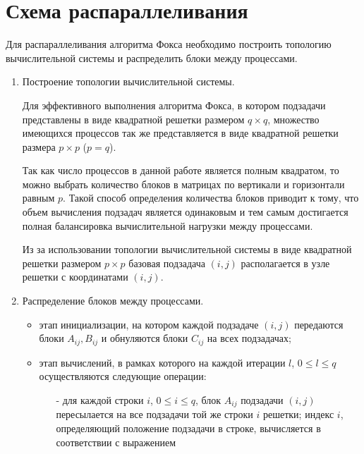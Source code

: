 \documentclass{report}
\begin{document}
\section*{Схема распараллеливания}
Для распараллеливания алгоритма Фокса необходимо построить топологию вычислительной системы и распределить блоки между процессами.

\begin{enumerate}
    \item Построение топологии вычислительной системы.
        \par Для эффективного выполнения алгоритма Фокса, в котором подзадачи представлены в виде квадратной решетки размером {\itshape $q \times q$}, множество имеющихся процессов так же представляется в виде квадратной решетки размера {\itshape $p \times p$} ({\itshape $p = q$}).
        \par Так как число процессов в данной работе является полным квадратом, то можно выбрать количество блоков в матрицах по вертикали и горизонтали равным {\itshape $p$}. Такой способ определения количества блоков приводит к тому, что объем вычисления подзадач является одинаковым и тем самым достигается полная балансировка вычислительной нагрузки между процессами.
        \par Из за использовании топологии вычислительной системы в виде квадратной решетки размером {\itshape $p \times p$} базовая подзадача {\itshape $(i,j)$} располагается в узле решетки с координатами {\itshape $(i,j)$}.
    \item Распределение блоков между процессами.
        \begin{itemize}
            \item этап инициализации, на котором каждой подзадаче {\itshape $(i,j)$} передаются блоки {\itshape $A_{ij}, B_{ij}$} и обнуляются блоки {\itshape $C_{ij}$} на всех подзадачах;
            \item этап вычислений, в рамках которого на каждой итерации {\itshape $l$}, {\itshape $0 \le l \le q$} осуществляются следующие операции:
            \begin{itemize}
                \item[-] для каждой строки {\itshape $i$}, {\itshape $0 \le i \le q$}, блок {\itshape $A_{ij}$} подзадачи {\itshape $(i,j)$} пересылается на все подзадачи той же строки {\itshape $i$} решетки; индекс {\itshape $i$}, определяющий положение подзадачи в строке, вычисляется в соответствии с выражением
                $$
$$
\end{itemize}
\end{itemize}
\end{enumerate}
\end{document}
